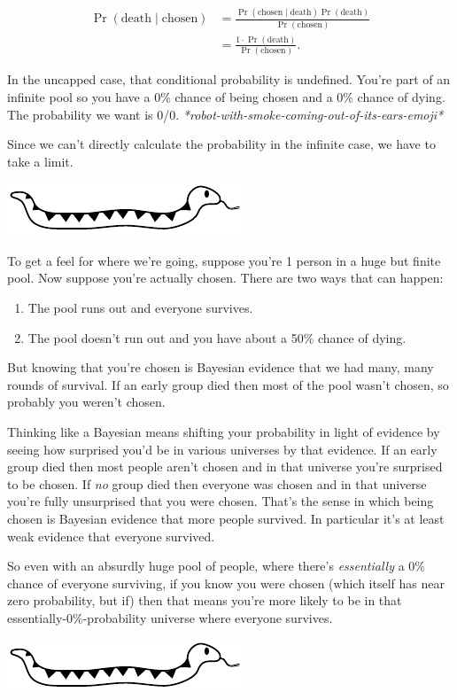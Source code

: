 \documentclass[article,twocolumn]{memoir}
\newcommand{\snakedivider}{
\vspace{.2em}
\begin{center}
\includegraphics[width=.25\linewidth]{snake}
\end{center}
\vspace{.1em}
}
\begin{document}
\begin{equation*}
\begin{split}
\Pr(\text{death} \mid \text{chosen}) & =
\frac{\Pr(\text{chosen} \mid \text{death}) \Pr(\text{death})}{\Pr(\text{chosen})} \\
& = \frac{1\cdot\Pr(\text{death})}{\Pr(\text{chosen})}.
\end{split}
\end{equation*}

In the uncapped case, that conditional probability is undefined. 
You're part of an infinite pool so you have a 0\% chance of being chosen and a 0\% chance of dying. 
The probability we want is 0/0. 
\emph{*robot-with-smoke-coming-out-of-its-ears-emoji*}

Since we can't directly calculate the probability in the infinite case, we have to take a limit.

\snakedivider

To get a feel for where we're going, suppose you're 1 person in a huge but finite pool.
Now suppose you're actually chosen. 
There are two ways that can happen: 
\begin{enumerate}
\item The pool runs out and everyone survives.
\item The pool doesn't run out and you have about a 50\% chance of dying. 
\end{enumerate}
But knowing that you're chosen is Bayesian evidence that we had many, many rounds of survival. 
If an early group died then most of the pool wasn't chosen, so probably you weren't chosen.

Thinking like a Bayesian means shifting your probability in light of evidence by seeing how surprised you'd be in various universes by that evidence.
If an early group died then most people aren't chosen and in that universe you're surprised to be chosen. 
If \emph{no} group died then everyone was chosen and in that universe you're fully unsurprised that you were chosen. 
That's the sense in which being chosen is Bayesian evidence that more people survived. 
In particular it's at least weak evidence that everyone survived.

So even with an absurdly huge pool of people, where there's \emph{essentially} a 0\% chance of everyone surviving, if you know you were chosen (which itself has near zero probability, but if) then that means you're more likely to be in that essentially-0\%-probability universe where everyone survives.

\snakedivider
\end{document}
